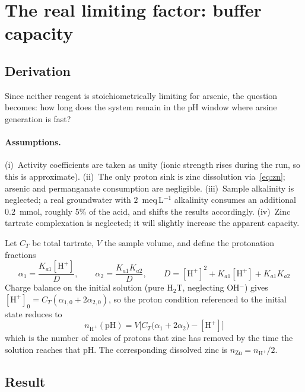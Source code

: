 \documentclass[11pt,a4paper]{article}
\begin{document}
\section{The real limiting factor: buffer capacity}

\subsection{Derivation}

Since neither reagent is stoichiometrically limiting for arsenic, the
question becomes: how long does the system remain in the pH window where
arsine generation is fast?

\paragraph{Assumptions.}
(i)~Activity coefficients are taken as unity (ionic strength rises during
the run, so this is approximate).
(ii)~The only proton sink is zinc dissolution via~\eqref{eq:zn}; arsenic and
permanganate consumption are negligible.
(iii)~Sample alkalinity is neglected; a real groundwater with
$2$~meq\,L$^{-1}$ alkalinity consumes an additional $0.2$~mmol, roughly
5\% of the acid, and shifts the results accordingly.
(iv)~Zinc tartrate complexation is neglected; it will slightly increase the
apparent capacity.

Let $C_T$ be total tartrate, $V$ the sample volume, and define the
protonation fractions
\begin{equation}
  \alpha_1 = \frac{K_{a1}[\mathrm{H^+}]}{D}, \qquad
  \alpha_2 = \frac{K_{a1}K_{a2}}{D}, \qquad
  D = [\mathrm{H^+}]^2 + K_{a1}[\mathrm{H^+}] + K_{a1}K_{a2}
\end{equation}
Charge balance on the initial solution (pure H$_2$T, neglecting OH$^-$)
gives $[\mathrm{H^+}]_0 = C_T(\alpha_{1,0} + 2\alpha_{2,0})$, so the
proton condition referenced to the initial state reduces to
\begin{equation}
  \boxed{\;
  n_{\mathrm{H^+}}(\mathrm{pH}) = V\Big[
    C_T\big(\alpha_1 + 2\alpha_2\big) - [\mathrm{H^+}]
  \Big]\;}
  \label{eq:proton}
\end{equation}
which is the number of moles of protons that zinc has removed by the time
the solution reaches that pH. The corresponding dissolved zinc is
$n_{\mathrm{Zn}} = n_{\mathrm{H^+}}/2$.

\subsection{Result}
\end{document}
